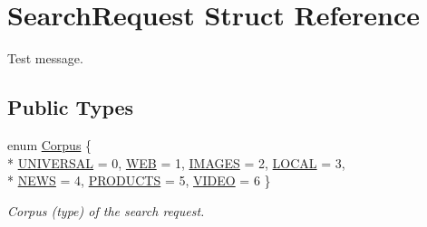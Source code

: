 \hypertarget{structSearchRequest}{}\section{Search\+Request Struct Reference}
\label{structSearchRequest}


Test message.  


\subsection*{Public Types}
\begin{DoxyCompactItemize}
\item 
enum \hyperlink{structSearchRequest_ac8fbf72607c24a8ebaee257fec80e7fa}{Corpus} \{ \\*
\hyperlink{structSearchRequest_ac8fbf72607c24a8ebaee257fec80e7faa346efe3e28f260dfbd38522f0d02da04}{U\+N\+I\+V\+E\+R\+S\+AL} = 0, 
\hyperlink{structSearchRequest_ac8fbf72607c24a8ebaee257fec80e7faa8ee2bd80198ce76eb38774e1d241c4d9}{W\+EB} = 1, 
\hyperlink{structSearchRequest_ac8fbf72607c24a8ebaee257fec80e7faa98ebe9413a727c7d0a45490531af9b49}{I\+M\+A\+G\+ES} = 2, 
\hyperlink{structSearchRequest_ac8fbf72607c24a8ebaee257fec80e7faaf991e75914cde5f817233a2bce81762e}{L\+O\+C\+AL} = 3, 
\\*
\hyperlink{structSearchRequest_ac8fbf72607c24a8ebaee257fec80e7faad12f4dad36f02e174bf21d1a3fb09b12}{N\+E\+WS} = 4, 
\hyperlink{structSearchRequest_ac8fbf72607c24a8ebaee257fec80e7faa67ff9b068bf93241b70573d8f41187b9}{P\+R\+O\+D\+U\+C\+TS} = 5, 
\hyperlink{structSearchRequest_ac8fbf72607c24a8ebaee257fec80e7faaeeefa4e6f9ffcb942dec5fc3b099b0d9}{V\+I\+D\+EO} = 6
 \}\begin{DoxyCompactList}\small\item\em Corpus (type) of the search request. \end{DoxyCompactList}
\end{DoxyCompactItemize}
